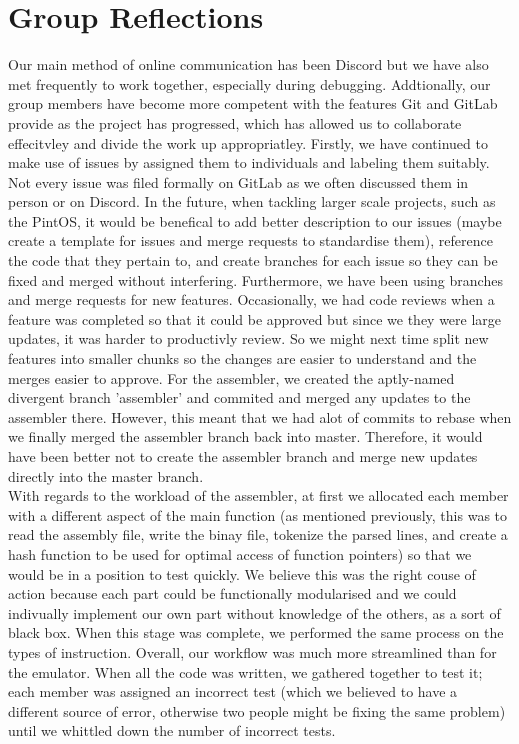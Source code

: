 \documentclass[11pt]{article}
\begin{document}
\pagebreak
\section{Group Reflections}
Our main method of online communication has been Discord but we have also met frequently to work together, especially during debugging. Addtionally, our group members have become more competent with the features Git and GitLab provide as the project has progressed, which has allowed us to collaborate effecitvley and divide the work up appropriatley. Firstly, we have continued to make use of issues by assigned them to individuals and labeling them suitably. Not every issue was filed formally on GitLab as we often discussed them in person or on Discord. In the future, when tackling larger scale projects, such as the PintOS, it would be benefical to add better description to our issues (maybe create a template for issues and merge requests to standardise them), reference the code that they pertain to, and create branches for each issue so they can be fixed and merged without interfering. Furthermore, we have been using branches and merge requests for new features. Occasionally, we had code reviews when a feature was completed so that it could be approved but since we they were large updates, it was harder to productivly review. So we might next time split new features into smaller chunks so the changes are easier to understand and the merges easier to approve. For the assembler, we created the aptly-named divergent branch 'assembler' and commited and merged any updates to the assembler there. However, this meant that we had alot of commits to rebase when we finally merged the assembler branch back into master. Therefore, it would have been better not to create the assembler branch and merge new updates directly into the master branch. \\
With regards to the workload of the assembler, at first we allocated each member with a different aspect of the main function (as mentioned previously, this was to read the assembly file, write the binay file, tokenize the parsed lines, and create a hash function to be used for optimal access of function pointers) so that we would be in a position to test quickly. We believe this was the right couse of action because  each part could be functionally modularised and we could indivually implement our own part without knowledge of the others, as a sort of black box. When this stage was complete, we performed the same process on the types of instruction. Overall, our workflow was much more streamlined than for the emulator. When all the code was written, we gathered together to test it; each member was assigned an incorrect test (which we believed to have a different source of error, otherwise two people might be fixing the same problem) until we whittled down the number of incorrect tests. 
\end{document}
